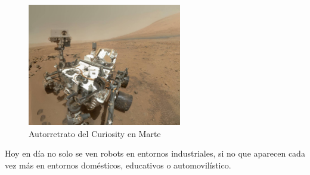 \begin{figure}[H]
\centering
\includegraphics[width=0.6\textwidth]{img/curiosity.jpg}
\caption{Autorretrato del Curiosity en Marte} \label{fig:curiosity}
\end{figure}


Hoy en día no solo se ven robots en entornos industriales, si no que aparecen cada vez más en entornos domésticos, educativos o automovilístico.

